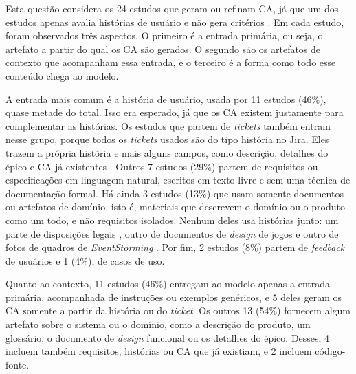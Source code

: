 Esta questão considera os 24 estudos que geram ou refinam CA, já que um dos estudos apenas avalia histórias de usuário e não gera critérios \cite{ma2026}. Em cada estudo, foram observados três aspectos. O primeiro é a entrada primária, ou seja, o artefato a partir do qual os CA são gerados. O segundo são os artefatos de contexto que acompanham essa entrada, e o terceiro é a forma como todo esse conteúdo chega ao modelo.

A entrada mais comum é a história de usuário, usada por 11 estudos (46\%), quase metade do total. Isso era esperado, já que os CA existem justamente para complementar as histórias. Os estudos que partem de \textit{tickets} também entram nesse grupo, porque todos os \textit{tickets} usados são do tipo história no Jira. Eles trazem a própria história e mais alguns campos, como descrição, detalhes do épico e CA já existentes \cite{baker2026,huang2026}. Outros 7 estudos (29\%) partem de requisitos ou especificações em linguagem natural, escritos em texto livre e sem uma técnica de documentação formal. Há ainda 3 estudos (13\%) que usam somente documentos ou artefatos de domínio, isto é, materiais que descrevem o domínio ou o produto como um todo, e não requisitos isolados. Nenhum deles usa histórias junto: um parte de disposições legais \cite{hassani2026}, outro de documentos de \textit{design} de jogos \cite{khelifa2026} e outro de fotos de quadros de \textit{EventStorming} \cite{jurgelaitis2026}. Por fim, 2 estudos (8\%) partem de \textit{feedback} de usuários e 1 (4\%), de casos de uso.

Quanto ao contexto, 11 estudos (46\%) entregam ao modelo apenas a entrada primária, acompanhada de instruções ou exemplos genéricos, e 5 deles geram os CA somente a partir da história ou do \textit{ticket}. Os outros 13 (54\%) fornecem algum artefato sobre o sistema ou o domínio, como a descrição do produto, um glossário, o documento de \textit{design} funcional ou os detalhes do épico. Desses, 4 incluem também requisitos, histórias ou CA que já existiam, e 2 incluem código-fonte.

